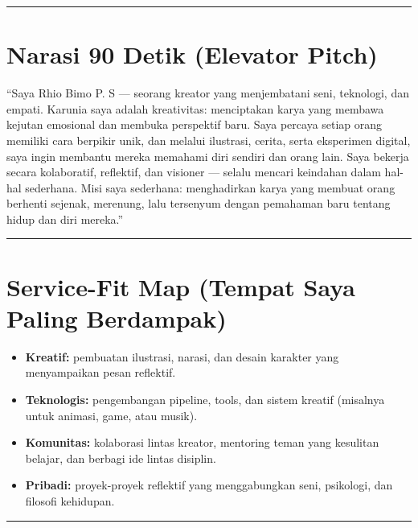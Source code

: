 \documentclass[
  letterpaper,
  DIV=11,
  numbers=noendperiod]{scrreprt}
\providecommand{\tightlist}{%
  \setlength{\itemsep}{0pt}\setlength{\parskip}{0pt}}
\begin{document}
\begin{center}\rule{0.5\linewidth}{0.5pt}\end{center}

\section{Narasi 90 Detik (Elevator
Pitch)}\label{narasi-90-detik-elevator-pitch}

``Saya Rhio Bimo P. S --- seorang kreator yang menjembatani seni,
teknologi, dan empati. Karunia saya adalah kreativitas: menciptakan
karya yang membawa kejutan emosional dan membuka perspektif baru. Saya
percaya setiap orang memiliki cara berpikir unik, dan melalui ilustrasi,
cerita, serta eksperimen digital, saya ingin membantu mereka memahami
diri sendiri dan orang lain. Saya bekerja secara kolaboratif, reflektif,
dan visioner --- selalu mencari keindahan dalam hal-hal sederhana. Misi
saya sederhana: menghadirkan karya yang membuat orang berhenti sejenak,
merenung, lalu tersenyum dengan pemahaman baru tentang hidup dan diri
mereka.''

\begin{center}\rule{0.5\linewidth}{0.5pt}\end{center}

\section{Service-Fit Map (Tempat Saya Paling
Berdampak)}\label{service-fit-map-tempat-saya-paling-berdampak}

\begin{itemize}
\tightlist
\item
  \textbf{Kreatif:} pembuatan ilustrasi, narasi, dan desain karakter
  yang menyampaikan pesan reflektif.\\
\item
  \textbf{Teknologis:} pengembangan pipeline, tools, dan sistem kreatif
  (misalnya untuk animasi, game, atau musik).\\
\item
  \textbf{Komunitas:} kolaborasi lintas kreator, mentoring teman yang
  kesulitan belajar, dan berbagi ide lintas disiplin.\\
\item
  \textbf{Pribadi:} proyek-proyek reflektif yang menggabungkan seni,
  psikologi, dan filosofi kehidupan.
\end{itemize}

\begin{center}\rule{0.5\linewidth}{0.5pt}\end{center}
\end{document}

